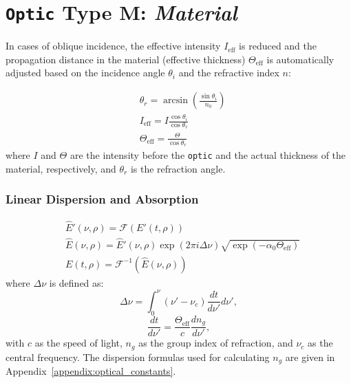 \section{\texttt{Optic} Type M: \textit{Material}}

In cases of oblique incidence, the effective intensity \(I_{\text{eff}}\) is reduced and the propagation distance in the material (effective thickness) \(\Theta_{\text{eff}}\) is automatically adjusted based on the incidence angle \(\theta_i\) and the refractive index \(n\):

\begin{equation}
 \begin{aligned}
   &\theta_r = \arcsin\left(\frac{\sin\theta_i}{n_0}\right)\\
   &I_{\text{eff}} = I \frac{\cos\theta_i}{\cos\theta_r}\\
   &\Theta_{\text{eff}} = \frac{\Theta}{\cos\theta_r} 
 \end{aligned}
\end{equation}
where \(I\) and \(\Theta\) are the intensity before the \texttt{optic} and the actual thickness of the material, respectively, and \(\theta_r\) is the refraction angle.

\subsubsection{Linear Dispersion and Absorption}
\begin{equation}
 \begin{aligned}
  &\widehat{E}'(\nu,\rho) = \mathcal{F}(E'(t,\rho))\\
  &\widehat{E}(\nu,\rho) = \widehat{E}'(\nu,\rho) \exp (2 \pi i \Delta \nu) \sqrt{\exp(-\alpha_0 \Theta_{\text{eff}})}\\
  &E(t,\rho) = \mathcal{F}^{-1}(\widehat{E}(\nu,\rho))
 \end{aligned}
\end{equation}
where \(\Delta \nu\) is defined as:
\begin{equation}\label{eq:Delta_nu_disp}
 \Delta \nu = \int_0^{\nu} (\nu'-\nu_c) \frac{dt}{d\nu'} d\nu',
\end{equation}
\begin{equation}
 \frac{dt}{d\nu'} = \frac{\Theta_{\text{eff}}}{c} \frac{dn_{g}}{d\nu'},
\end{equation}
with \(c\) as the speed of light, \(n_{g}\) as the group index of refraction, and \(\nu_c\) as the central frequency. The dispersion formulas used for calculating \(n_{g}\) are given in Appendix~\ref{appendix:optical_constants}.

